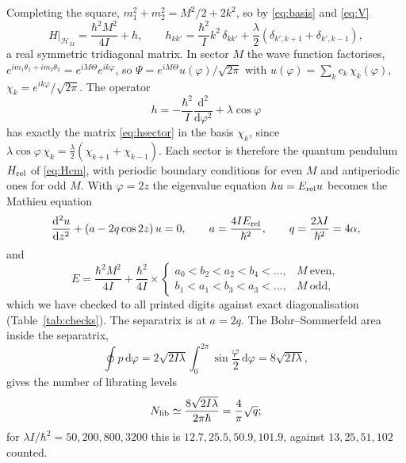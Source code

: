 \documentclass[preprint,12pt]{elsarticle}
\newcommand{\dd}{\mathrm{d}}
\newcommand{\Erel}{E_{\rm rel}}
\begin{document}
Completing the square, $m_{1}^{2}+m_{2}^{2}=M^{2}/2+2k^{2}$, so by
\eqref{eq:basis} and \eqref{eq:V}
\begin{equation}
H\big|_{\mathcal{H}_{M}}=\frac{\hbar^{2}M^{2}}{4I}+h,\qquad
h_{kk'}=\frac{\hbar^{2}}{I}k^{2}\,\delta_{kk'}
+\frac{\lambda}{2}\left(\delta_{k',k+1}+\delta_{k',k-1}\right),
\label{eq:hsector}
\end{equation}
a real symmetric tridiagonal matrix. In sector $M$ the wave function
factorises,
$e^{im_{1}\theta_{1}+im_{2}\theta_{2}}=e^{iM\Theta}e^{ik\varphi}$, so
$\Psi=e^{iM\Theta}u(\varphi)/\sqrt{2\pi}$ with
$u(\varphi)=\sum_{k}c_{k}\,\chi_{k}(\varphi)$, $\chi_{k}=e^{ik\varphi}/\sqrt{2\pi}$.
The operator
\begin{equation}
h=-\frac{\hbar^{2}}{I}\frac{\dd^{2}}{\dd\varphi^{2}}+\lambda\cos\varphi
\label{eq:mathieuop}
\end{equation}
has exactly the matrix \eqref{eq:hsector} in the basis $\chi_{k}$, since
$\lambda\cos\varphi\,\chi_{k}=\tfrac{\lambda}{2}(\chi_{k+1}+\chi_{k-1})$. Each
sector is therefore the quantum pendulum $H_{\rm rel}$ of \eqref{eq:Hcm}, with
periodic boundary conditions for even $M$ and antiperiodic ones for odd $M$.
With $\varphi=2z$ the eigenvalue equation $hu=\Erel u$ becomes the Mathieu
equation~\cite{DLMF28,AbramowitzStegun}
\begin{equation}
\frac{\dd^{2}u}{\dd z^{2}}+\left(a-2q\cos2z\right)u=0,\qquad
a=\frac{4I\Erel}{\hbar^{2}},\qquad q=\frac{2\lambda I}{\hbar^{2}}=4\alpha,
\label{eq:mathieu}
\end{equation}
and
\begin{equation}
E=\frac{\hbar^{2}M^{2}}{4I}+\frac{\hbar^{2}}{4I}\times
\begin{cases}a_{0}<b_{2}<a_{2}<b_{4}<\dots, & M\ \text{even},\\[2pt]
b_{1}<a_{1}<b_{3}<a_{3}<\dots, & M\ \text{odd},\end{cases}
\label{eq:Emathieu}
\end{equation}
which we have checked to all printed digits against exact diagonalisation
(Table~\ref{tab:checks}). The separatrix is at $a=2q$. The Bohr--Sommerfeld
area inside the separatrix,
\begin{equation}
\oint p\,\dd\varphi=2\sqrt{2I\lambda}\int_{0}^{2\pi}\sin\frac{\varphi}{2}\,\dd\varphi
=8\sqrt{2I\lambda},
\end{equation}
gives the number of librating levels
\begin{equation}
N_{\rm lib}\simeq\frac{8\sqrt{2I\lambda}}{2\pi\hbar}=\frac{4}{\pi}\sqrt{q};
\end{equation}
for $\lambda I/\hbar^{2}=50,200,800,3200$ this is $12.7,25.5,50.9,101.9$,
against $13,25,51,102$ counted.
\end{document}

